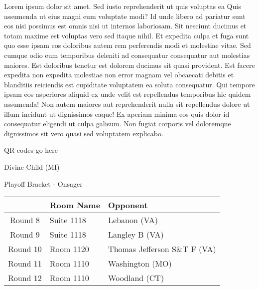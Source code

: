 \documentclass{article}%
\begin{document}
\vspace*{8pt}%
\linebreak%
\newline%
\newline%
Lorem ipsum dolor sit amet. Sed iusto reprehenderit ut quis voluptas ea Quis assumenda ut eius magni eum voluptate modi? Id unde libero ad pariatur sunt eos nisi possimus est omnis nisi ut internos laboriosam. Sit nesciunt ducimus et totam maxime est voluptas vero sed itaque nihil. Et expedita culpa et fuga sunt quo esse ipsam eos doloribus autem rem perferendis modi et molestiae vitae.\newline%
\newline%
Sed cumque odio eum temporibus deleniti ad consequatur consequatur aut molestias maiores. Est doloribus tenetur est dolorem ducimus sit quasi provident. Est facere expedita non expedita molestiae non error magnam vel obcaecati debitis et blanditiis reiciendis est cupiditate voluptatem ea soluta consequatur. Qui tempore ipsam eos asperiores aliquid ex unde velit est repellendus temporibus hic quidem assumenda!\newline%
\newline%
Non autem maiores aut reprehenderit nulla sit repellendus dolore ut illum incidunt ut dignissimos eaque! Ex aperiam minima eos quis dolor id consequatur eligendi ut culpa galisum. Non fugiat corporis vel doloremque dignissimos sit vero quasi sed voluptatem explicabo.\newline%
\newline%
%
\vspace*{30pt}%
\begin{center}%
\begin{Huge}%
QR codes go here%
\end{Huge}%
\end{center}%
\newpage%
\begin{center}%
\begin{Huge}%
Divine Child (MI)%
\end{Huge}%
\vspace*{8pt}%
\linebreak%
\begin{Large}%
Playoff Bracket {-} Onsager%
\end{Large}%
\end{center}%
%
\begin{tabularx}{\textwidth}{|c|Y|Y|}%
\hline%
&Room Name&Opponent\\%
\hline%
Round 8&Suite 1118&Lebanon (VA)\\%
Round 9&Suite 1118&Langley B (VA)\\%
Round 10&Room 1120&Thomas Jefferson S\&T F (VA)\\%
Round 11&Room 1110&Washington (MO)\\%
Round 12&Room 1110&Woodland (CT)\\%
\hline%
\end{tabularx}%
\end{document}
